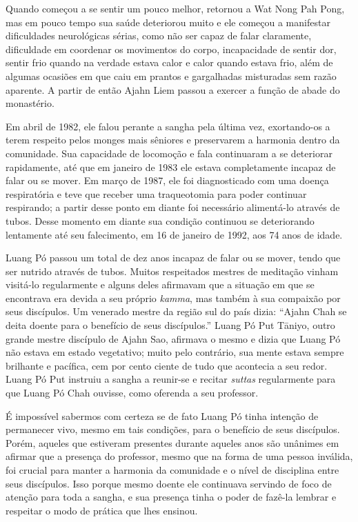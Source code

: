 Quando começou a se sentir um pouco melhor, retornou a Wat Nong Pah
Pong, mas em pouco tempo sua saúde deteriorou muito e ele começou a
manifestar dificuldades neurológicas sérias, como não ser capaz de falar
claramente, dificuldade em coordenar os movimentos do corpo,
incapacidade de sentir dor, sentir frio quando na verdade estava calor e
calor quando estava frio, além de algumas ocasiões em que caiu em
prantos e gargalhadas misturadas sem razão aparente. A partir de então
Ajahn Liem passou a exercer a função de abade do monastério.

Em abril de 1982, ele falou perante a sangha pela última vez,
exortando-os a terem respeito pelos monges mais sêniores e preservarem a
harmonia dentro da comunidade. Sua capacidade de locomoção e fala
continuaram a se deteriorar rapidamente, até que em janeiro de 1983 ele
estava completamente incapaz de falar ou se mover. Em março de 1987, ele
foi diagnosticado com uma doença respiratória e teve que receber uma
traqueotomia para poder continuar respirando; a partir desse ponto em
diante foi necessário alimentá-lo através de tubos. Desse momento em
diante sua condição continuou se deteriorando lentamente até seu
falecimento, em 16 de janeiro de 1992, aos 74 anos de idade.

Luang Pó passou um total de dez anos incapaz de falar ou se mover, tendo
que ser nutrido através de tubos. Muitos respeitados mestres de
meditação vinham visitá-lo regularmente e alguns deles afirmavam que a
situação em que se encontrava era devida a seu próprio \emph{kamma}, mas
também à sua compaixão por seus discípulos. Um venerado mestre da região
sul do país dizia: ``Ajahn Chah se deita doente para o benefício de seus
discípulos.'' Luang Pó Put Tāniyo, outro grande mestre discípulo de
Ajahn Sao, afirmava o mesmo e dizia que Luang Pó não estava em estado
vegetativo; muito pelo contrário, sua mente estava sempre brilhante e
pacífica, cem por cento ciente de tudo que acontecia a seu redor. Luang
Pó Put instruiu a sangha a reunir-se e recitar \emph{suttas}
regularmente para que Luang Pó Chah ouvisse, como oferenda a seu
professor.

É impossível sabermos com certeza se de fato Luang Pó tinha intenção de
permanecer vivo, mesmo em tais condições, para o benefício de seus
discípulos. Porém, aqueles que estiveram presentes durante aqueles anos
são unânimes em afirmar que a presença do professor, mesmo que na forma
de uma pessoa inválida, foi crucial para manter a harmonia da comunidade
e o nível de disciplina entre seus discípulos. Isso porque mesmo doente
ele continuava servindo de foco de atenção para toda a sangha, e sua
presença tinha o poder de fazê-la lembrar e respeitar o modo de prática
que lhes ensinou.

